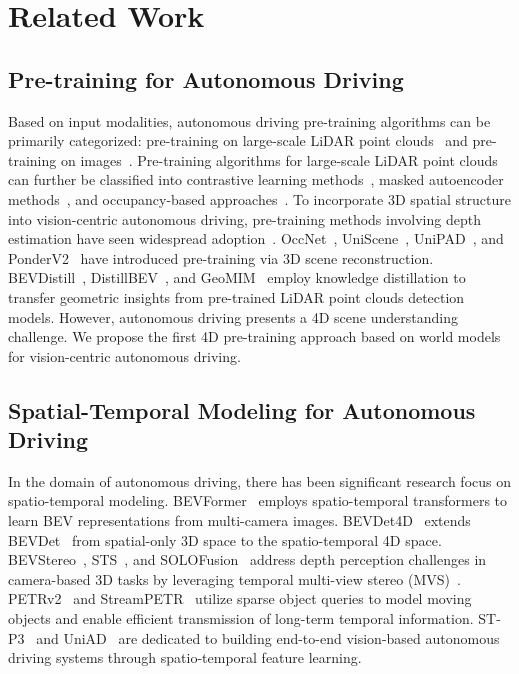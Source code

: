 \section{Related Work}
\subsection{Pre-training for Autonomous Driving}
Based on input modalities, autonomous driving pre-training algorithms can be primarily categorized: pre-training on large-scale LiDAR point clouds~\cite{ad-pt,fei2023self,uni3d} and pre-training on images~\cite{liang2022effective,survey2,chen2021multisiam}. Pre-training algorithms for large-scale LiDAR point clouds can further be classified into contrastive learning methods~\cite{strl,gcc3d,proposalcontrast,bevcontrast,sheng2023contrastive,chen2022co}, masked autoencoder methods~\cite{occupancy-mae,voxel-mae,gd-mae,geomae,mv-jar}, and occupancy-based approaches~\cite{iscc,occupancy-mae,also,spot}. To incorporate 3D spatial structure into vision-centric autonomous driving, pre-training methods involving depth estimation have seen widespread adoption~\cite{dd3d,ppgeo}. OccNet~\cite{occnet}, UniScene~\cite{uniscene}, UniPAD~\cite{unipad}, and PonderV2~\cite{ponderv2} have introduced pre-training via 3D scene reconstruction. BEVDistill~\cite{bevdistill}, DistillBEV~\cite{distillbev}, and GeoMIM~\cite{geomim} employ knowledge distillation to transfer geometric insights from pre-trained LiDAR point clouds detection models. However, autonomous driving presents a 4D scene understanding challenge. We propose the first 4D pre-training approach based on world models for vision-centric autonomous driving.
\subsection{Spatial-Temporal Modeling for Autonomous Driving}
In the domain of autonomous driving, there has been significant research focus on spatio-temporal modeling. BEVFormer~\cite{bevformer} employs spatio-temporal transformers to learn BEV representations from multi-camera images. BEVDet4D~\cite{bevdet4d} extends BEVDet~\cite{bevdet} from spatial-only 3D space to the spatio-temporal 4D space. BEVStereo~\cite{bevstereo}, STS~\cite{sts}, and SOLOFusion~\cite{solofusion} address depth perception challenges in camera-based 3D tasks by leveraging temporal multi-view stereo (MVS)~\cite{mvs}. PETRv2~\cite{petrv2} and StreamPETR~\cite{streampetr} utilize sparse object queries to model moving objects and enable efficient transmission of long-term temporal information. ST-P3~\cite{stp3} and UniAD~\cite{uniad} are dedicated to building end-to-end vision-based autonomous driving systems through spatio-temporal feature learning.

